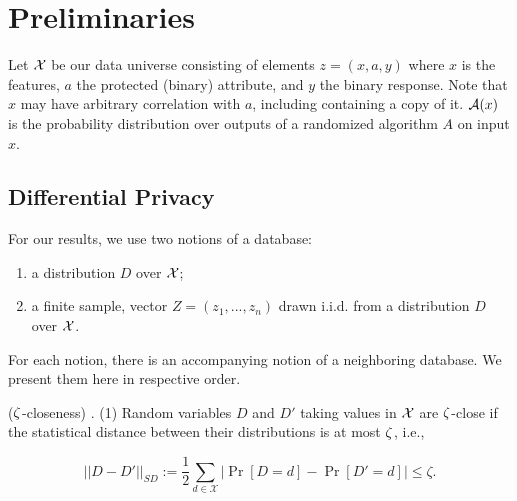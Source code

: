 
\section{Preliminaries}
Let $\mathcal{X}$ be our data universe consisting of elements $z=(x,a,y)$
 where $x$ is the features, $a$ the protected (binary) attribute, and
 $y$ the binary response. Note that $x$ may have arbitrary correlation
 with $a$, including containing a copy of it. $\mathcal{A}(x)$ is the
 probability distribution over outputs of a randomized algorithm $A$ on
 input $x$.





\subsection{Differential Privacy}

For our results, we use two notions of a database:

\begin{enumerate}
	\item a distribution $D$ over $\mathcal{X}$;
	\item a finite sample, vector $Z = (z_1, ..., z_n)$ drawn i.i.d. from a distribution $D$ over $\mathcal{X}$.
\end{enumerate}
For each notion, there is an accompanying notion of a neighboring
database. We present them here in respective order.

\begin{defn}
  ($\zeta$-closeness) \cite{2dplimits}. (1) Random variables $D$ and $D'$ taking values in
  $\mathcal{X}$ are $\zeta$-close if the statistical distance between their
  distributions is at most $\zeta$, i.e.,

	$$ ||D-D'||_{\textit{SD}} :=\frac{1}{2}\sum_{d\in \mathcal{X}}
  |\Pr[D=d] - \Pr[D'=d]| \leq \zeta.$$
\end{defn}


